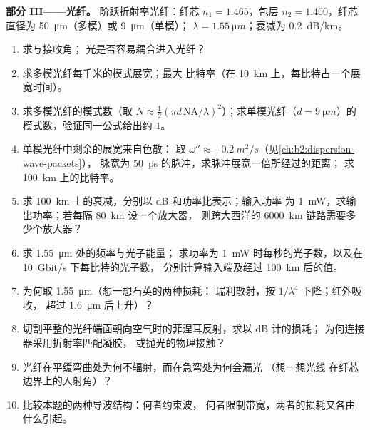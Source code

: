 \begin{problem}
\medskip
\noindent\textbf{部分 III——光纤。}
阶跃折射率光纤：纤芯 $n_1 = 1.465$，包层 $n_2 = 1.460$，纤芯
直径为 \qty{50}{\micro m}（多模）或 \qty{9}{\micro m}（单模）；
$\lambda = \qty{1.55}{\micro m}$；衰减为 \qty{0.2}{dB/km}。
\begin{enumerate}[resume]
  \item 求与接收角；
        光是否容易耦合进入光纤？
  \item 求多模光纤每千米的模式展宽；最大
        比特率（在 \qty{10}{km} 上，每比特占一个展宽时间）。
  \item 求多模光纤的模式数（取 $N \approx
        \tfrac12(\pi d\,\mathrm{NA}/\lambda)^2$）；求单模光纤（$d =
        \qty{9}{\micro m}$）的模式数，验证同一公式给出约 $1$。
  \item 单模光纤中剩余的展宽来自色散：
        取 $\omega'' \approx \qty{-0.2}{m^2/s}$（见\cref{ch:b2:dispersion-wave-packets}），
        脉宽为 \qty{50}{ps} 的脉冲，求脉冲展宽一倍所经过的距离；
        求 \qty{100}{km} 上的比特率。
  \item 求 \qty{100}{km} 上的衰减，分别以 dB 和功率比表示；输入功率
        为 \qty{1}{mW}，求输出功率；若每隔 \qty{80}{km} 设一个放大器，
        则跨大西洋的 \qty{6000}{km} 链路需要多少个放大器？
  \item 求 \qty{1.55}{\micro m} 处的频率与光子能量；
        求功率为 \qty{1}{mW} 时每秒的光子数，以及在 \qty{10}{Gbit/s} 下每比特的光子数，
        分别计算输入端及经过 \qty{100}{km} 后的值。
  \item 为何取 \qty{1.55}{\micro m}（想一想石英的两种损耗：
        瑞利散射，按 $1/\lambda^4$ 下降；红外吸收，
        超过 \qty{1.6}{\micro m} 后上升）？
  \item 切割平整的光纤端面朝向空气时的菲涅耳反射，求以 dB 计的损耗；
        为何连接器采用折射率匹配凝胶，
        或抛光的物理接触？
  \item 光纤在平缓弯曲处为何不辐射，而在急弯处为何会漏光
        （想一想光线
        在纤芯边界上的入射角）？
  \item 比较本题的两种导波结构：何者约束波，
        何者限制带宽，两者的损耗又各由什么引起。
\end{enumerate}
\end{problem}
